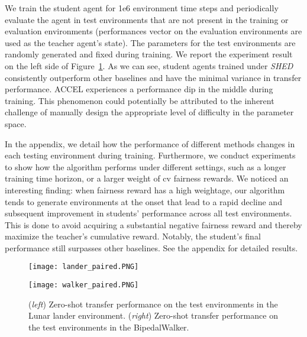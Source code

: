 \documentclass{article}
\newcommand\algo{\emph{SHED }}
\begin{document}
We train the student agent for 1e6 environment time steps and periodically evaluate the agent in test environments that are not present in the training or evaluation environments (performances vector on the evaluation environments are used as the teacher agent's state). The parameters for the test environments are randomly generated and fixed during training. We report the experiment result on the left side of Figure~\ref{fig:performance}. As we can see, student agents trained under \algo consistently outperform other baselines and have the minimal variance in transfer performance. ACCEL experiences a performance dip in the middle during training. This phenomenon could potentially be attributed to the inherent challenge of manually design the appropriate level of difficulty in the parameter space.

In the appendix, we detail how the performance of different methods changes in each testing environment during training. Furthermore, we conduct experiments to show how the algorithm performs under different settings, such as a longer training time horizon, or a larger weight of cv fairness rewards. We noticed an interesting finding: when fairness reward has a high weightage, our algorithm tends to generate environments at the onset that lead to a rapid decline and subsequent improvement in students' performance across all test environments. This is done to avoid acquiring a substantial negative fairness reward and thereby maximize the teacher's cumulative reward. Notably, the student's final performance still surpasses other baselines. See the appendix for detailed results.


\begin{figure}[t]
    \centering
    \begin{minipage}[b]{0.46\textwidth}
        \texttt{[image: lander\_paired.PNG]}
    \end{minipage}
    \hfill
    \begin{minipage}[b]{0.46\textwidth}
        \texttt{[image: walker\_paired.PNG]}
    \end{minipage}
    \caption{({\em left}) Zero-shot transfer performance on the test environments in the Lunar lander environment. ({\em right}) Zero-shot transfer performance on the test environments in the BipedalWalker.}
    \label{fig:performance}%
\end{figure}
\end{document}
